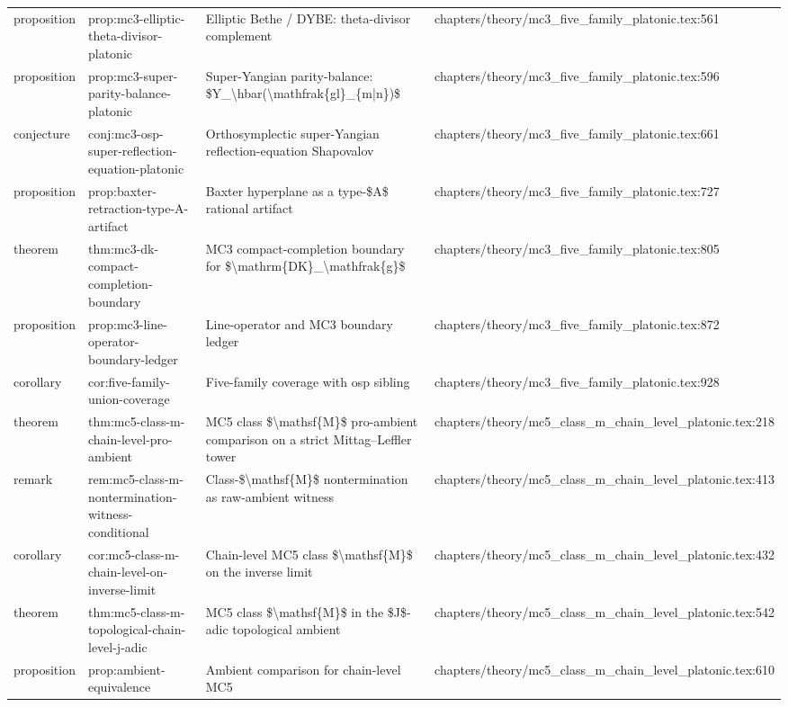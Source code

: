 \documentclass[11pt]{article}
\begin{document}
\begin{longtable}{L{0.10\textwidth}L{0.26\textwidth}L{0.42\textwidth}L{0.22\textwidth}}
proposition & prop:mc3-elliptic-theta-divisor-platonic & Elliptic Bethe / DYBE: theta-divisor complement & chapters/theory/mc3\_five\_family\_platonic.tex:561\\
proposition & prop:mc3-super-parity-balance-platonic & Super-Yangian parity-balance: \$Y\_\textbackslash{}hbar(\textbackslash{}mathfrak\{gl\}\_\{m|n\})\$ & chapters/theory/mc3\_five\_family\_platonic.tex:596\\
conjecture & conj:mc3-osp-super-reflection-equation-platonic & Orthosymplectic super-Yangian reflection-equation Shapovalov & chapters/theory/mc3\_five\_family\_platonic.tex:661\\
proposition & prop:baxter-retraction-type-A-artifact & Baxter hyperplane as a type-\$A\$ rational artifact & chapters/theory/mc3\_five\_family\_platonic.tex:727\\
theorem & thm:mc3-dk-compact-completion-boundary & MC3 compact-completion boundary for \$\textbackslash{}mathrm\{DK\}\_\textbackslash{}mathfrak\{g\}\$ & chapters/theory/mc3\_five\_family\_platonic.tex:805\\
proposition & prop:mc3-line-operator-boundary-led{}ger & Line-operator and MC3 boundary led{}ger & chapters/theory/mc3\_five\_family\_platonic.tex:872\\
corollary & cor:five-family-union-coverage & Five-family coverage with osp sibling & chapters/theory/mc3\_five\_family\_platonic.tex:928\\
theorem & thm:mc5-class-m-chain-level-pro-ambient & MC5 class \$\textbackslash{}mathsf\{M\}\$ pro-ambient comparison on a strict Mittag--Leffler tower & chapters/theory/mc5\_class\_m\_chain\_level\_platonic.tex:218\\
remark & rem:mc5-class-m-nontermination-witness-cond{}itional & Class-\$\textbackslash{}mathsf\{M\}\$ nontermination as raw-ambient witness & chapters/theory/mc5\_class\_m\_chain\_level\_platonic.tex:413\\
corollary & cor:mc5-class-m-chain-level-on-inverse-limit & Chain-level MC5 class \$\textbackslash{}mathsf\{M\}\$ on the inverse limit & chapters/theory/mc5\_class\_m\_chain\_level\_platonic.tex:432\\
theorem & thm:mc5-class-m-topological-chain-level-j-adic & MC5 class \$\textbackslash{}mathsf\{M\}\$ in the \$J\$-adic topological ambient & chapters/theory/mc5\_class\_m\_chain\_level\_platonic.tex:542\\
proposition & prop:ambient-equivalence & Ambient comparison for chain-level MC5 & chapters/theory/mc5\_class\_m\_chain\_level\_platonic.tex:610\\

\end{longtable}
\end{document}
